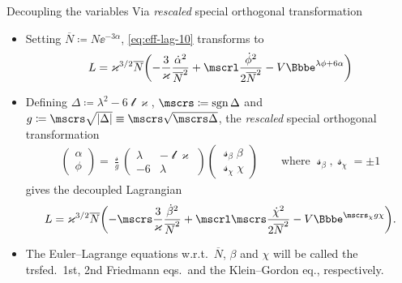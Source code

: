 \documentclass[9pt]{beamer}
\begin{document}
\begin{frame}%
{Decoupling the variables}%
{Via \emph{rescaled} special orthogonal transformation}
\begin{itemize}
\item Setting $\overline{N} \coloneqq N\ee^{-3\alpha}$, \cref{eq:eff-lag-10}
transforms to
\begin{align}
L = \varkappa^{3/2}\overline{N}
\rbr{-\frac{3}{\varkappa}\frac{\dot{\alpha}^2}{\overline{N}^2}
+\mscrl\frac{\dot{\phi}^2}{2\overline{N}^2} - V\ee^{\lambda\phi+6\alpha}}
\end{align}

\item Defining $\Delta \coloneqq \lambda^2 - 6\mscrl\varkappa$,
$\mscrs \coloneqq \sgn \Delta$ and
$g \coloneqq \mscrs \sqrt{\vbr{\Delta}} \equiv \mscrs\sqrt{\mscrs\Delta}$,
the \emph{rescaled} special orthogonal transformation
\begin{align}
\begin{pmatrix}
\alpha \\ \phi
\end{pmatrix} = \frac{\mscrs}{g}
\begin{pmatrix}
\lambda & -\mscrl\varkappa \\
-6 & \lambda
\end{pmatrix}
\begin{pmatrix}
\mscrs_\beta \beta \\ \mscrs_\chi \chi
\end{pmatrix}\qquad\text{where } \mscrs_\beta, \mscrs_\chi = \pm 1
\end{align}
gives the decoupled Lagrangian
\begin{align}
L = \varkappa^{3/2}\overline{N}
\rbr{-\mscrs\frac{3}{\varkappa}\frac{\dot{\beta}^2}{\overline{N}^2}
+\mscrl\mscrs\frac{\dot{\chi}^2}{2\overline{N}^2}
-V\ee^{\mscrs_\chi g\chi}}.
\label{eq:lagrangian-decoupled}
\end{align}

\item
The Euler--Lagrange equations w.r.t.\ $\overline{N}$, $\beta$ and
$\chi$ will be called the trsfed.\ 1st, 2nd Friedmann eqs.\ and the
Klein--Gordon eq., respectively.
\end{itemize}
\end{frame}
\end{document}
